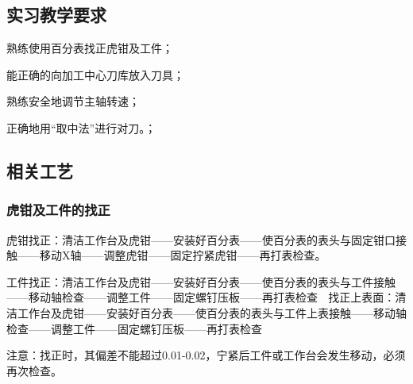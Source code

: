 \jxhj{%
	}

\makeshouye %

\subsection{实习教学要求}
\begin{compactenum}[\hspace{2em}1、]
\item 熟练使用百分表找正虎钳及工件；
\item 能正确的向加工中心刀库放入刀具；
\item 熟练安全地调节主轴转速；
\item 	正确地用“取中法”进行对刀。；
\end{compactenum}

\subsection{相关工艺}
\subsubsection{虎钳及工件的找正}
虎钳找正：清洁工作台及虎钳——安装好百分表——使百分表的表头与固定钳口接触——移动X轴——调整虎钳——固定拧紧虎钳——再打表检查。

工件找正：清洁工作台及虎钳——安装好百分表——使百分表的表头与工件接触——移动轴检查——调整工件——固定螺钉压板——再打表检查
	
找正上表面：清洁工作台及虎钳——安装好百分表——使百分表的表头与工件上表接触——移动轴检查——调整工件——固定螺钉压板——再打表检查

注意：找正时，其偏差不能超过0.01-0.02，宁紧后工件或工作台会发生移动，必须再次检查。

